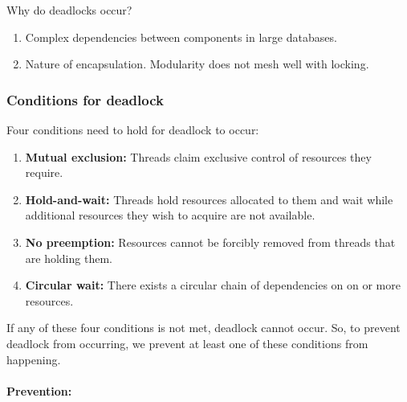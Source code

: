 Why do deadlocks occur?

\begin{enumerate}
    \item Complex dependencies between components in large databases. 
    \item Nature of encapsulation. Modularity does not mesh well with locking.
\end{enumerate}

\subsubsection{Conditions for deadlock}

Four conditions need to hold for deadlock to occur:

\begin{enumerate}
    \item \textbf{Mutual exclusion:} Threads claim exclusive control of resources
        they require.
    \item \textbf{Hold-and-wait:} Threads hold resources allocated to them
        and wait while additional resources they wish to acquire are not available.
    \item \textbf{No preemption:} Resources cannot be forcibly removed from
        threads that are holding them.
    \item \textbf{Circular wait:} There exists a circular chain of dependencies
        on on or more resources.
\end{enumerate}

If any of these four conditions is not met, deadlock cannot occur. So, to prevent
deadlock from occurring, we prevent at least one of these conditions from happening.

\paragraph{Prevention:}

